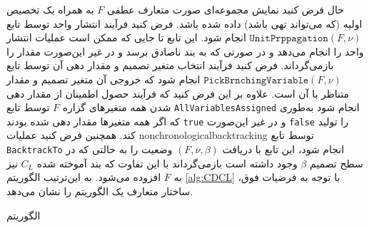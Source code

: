 حال فرض کنید  نمایش  مجموعه‌ای  صورت متعارف عطفی 
$F$
به همراه  یک تخصیص اولیه (که می‌تواند تهی باشد) داده شده باشد.  فرض کنید   فرآیند انتشار واحد  توسط تابع 
$\texttt{UnitPrppagation}(F, \nu)$
انجام شود. این تابع تا جایی که ممکن است  عملیات انتشار واحد را انجام می‌دهد و در صورتی که به بند ناصادق برسد 
و در غیر این‌صورت مقدار 
را بازمی‌گرداند.    فرض کنید  فرآیند انتخاب متغیر تصمیم و مقدار دهی آن توسط تابع 
$\texttt{PickBrnchingVariable}(F, \nu)$
انجام شود که خروجی آن متغیر تصمیم و مقدار متناظر با آن است. علاوه بر این فرض  کنید که فرآیند حصول اطمینان از مقدار دهی شدن همه متغیرهای گزاره  
$F$
توسط تابع 
\texttt{AllVariablesAssigned}
انجام شود به‌طوری که اگر همه متغیرها مقدار دهی شده بودند 
\texttt{true}
و در غیر این‌صورت 
\texttt{false}
را تولید کند.  همچنین فرض کنید عملیات 
\gls*{nonchronologicalbacktracking}
توسط تابع 
\texttt{BacktrackTo}
انجام شود، این تابع با دریافت 
$(F, \nu, \beta)$
وضعیت را به  حالتی که در سطح تصمیم 
$\beta$
وجود داشته است بازمی‌گرداند با این تفاوت که بند آموخته شده 
$C_{L}$
نیز به 
$F$
افزوده می‌شود. 
به این‌ترتیب  الگوریتم 
\ref{alg:CDCL}
با توجه به فرضیات فوق، ساختار متعارف یک الگوریتم 
را نشان می‌دهد. 
\begin{algorithm}
	\renewcommand{\algorithmicrequire}{\textbf{Input:}}
	\renewcommand{\algorithmicensure}{\textbf{Output:}}
	\caption{الگوریتم  
		}
	\label{alg:CDCL}
	\begin{latin}
		\begin{algorithmic}[1]
			\ENDIF			
			\quad{}
			\ELSE
			\ENDIF			
			\ENDIF			
			\ENDWHILE
			\EndFunction
		\end{algorithmic}
	\end{latin}
\end{algorithm}


